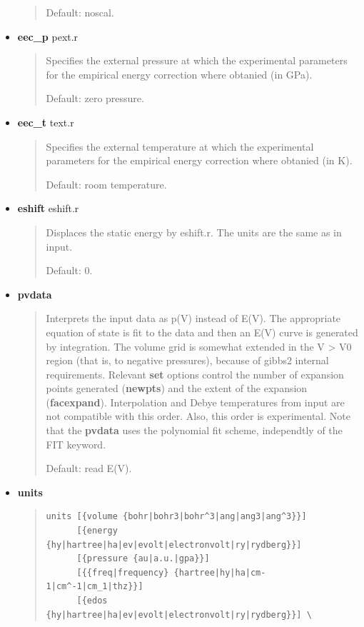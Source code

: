 \documentclass[a4paper]{article}
\begin{document}
\begin{itemize}
\begin{quote}
Default: noscal.

\end{quote}

\item \textbf{eec\_p} pext.r
%
\begin{quote}

Specifies the external pressure at which the experimental
parameters for the empirical energy correction where obtanied (in
GPa).

Default: zero pressure.

\end{quote}

\item \textbf{eec\_t} text.r
%
\begin{quote}

Specifies the external temperature at which the experimental
parameters for the empirical energy correction where obtanied (in
K).

Default: room temperature.

\end{quote}

\item \textbf{eshift} eshift.r
%
\begin{quote}

Displaces the static energy by eshift.r. The units are the same as
in input.

Default: 0.

\end{quote}

\item \textbf{pvdata}
%
\begin{quote}

Interprets the input data as p(V) instead of E(V). The appropriate
equation of state is fit to the data and then an E(V) curve is
generated by integration. The volume grid is somewhat extended in
the V > V0 region (that is, to negative pressures), because of
gibbs2 internal requirements. Relevant \textbf{set} options control the
number of expansion points generated (\textbf{newpts}) and the extent of
the expansion (\textbf{facexpand}). Interpolation and Debye temperatures
from input are not compatible with this order. Also, this order is
experimental. Note that the \textbf{pvdata} uses the polynomial fit
scheme, independtly of the FIT keyword.

Default: read E(V).

\end{quote}

\item \textbf{units}
%
\begin{quote}
%
\gibbslist
\begin{lstlisting}
units [{volume {bohr|bohr3|bohr^3|ang|ang3|ang^3}}]
      [{energy {hy|hartree|ha|ev|evolt|electronvolt|ry|rydberg}}]
      [{pressure {au|a.u.|gpa}}]
      [{{freq|frequency} {hartree|hy|ha|cm-1|cm^-1|cm_1|thz}}]
      [{edos {hy|hartree|ha|ev|evolt|electronvolt|ry|rydberg}}] \
\end{lstlisting}


\end{quote}
\end{itemize}
\end{document}
